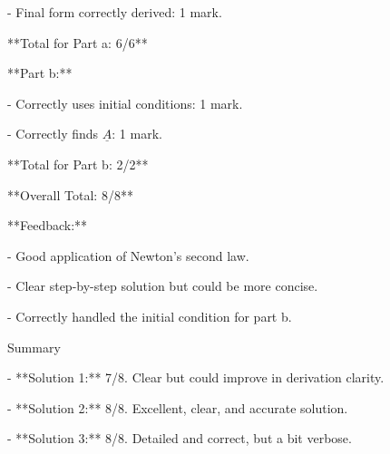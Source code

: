 \documentclass[a4paper,11pt]{article}
\begin{document}
- Final form correctly derived: 1 mark.

**Total for Part a: 6/6**

**Part b:**

- Correctly uses initial conditions: 1 mark.

- Correctly finds \( \underline{A} \): 1 mark.

**Total for Part b: 2/2**

**Overall Total: 8/8**

**Feedback:**

- Good application of Newton's second law.

- Clear step-by-step solution but could be more concise.

- Correctly handled the initial condition for part b.

Summary

- **Solution 1:** 7/8. Clear but could improve in derivation clarity.

- **Solution 2:** 8/8. Excellent, clear, and accurate solution.

- **Solution 3:** 8/8. Detailed and correct, but a bit verbose.
\end{document}
